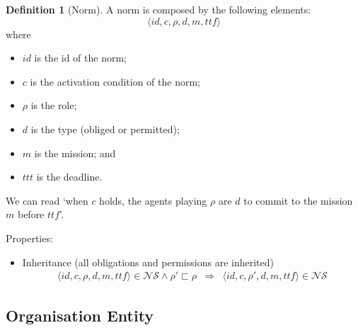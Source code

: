 \documentclass{article}
\newcommand{\set}[1]{\mathcal{#1}}
\newcommand{\subrole}{\sqsubset}
\theoremstyle{definition} \newtheorem{definition}{Definition}
\begin{document}
\begin{definition}[Norm]
  A norm is composed by the following elements:
 \begin{displaymath}
    \langle id, c, \rho, d, m, ttf \rangle
  \end{displaymath}
  where 
  \begin{itemize}
  \item $id$ is the id of the norm;
  \item $c$ is the activation condition of the norm;
  \item $\rho$ is the role;
  \item $d$ is the type (obliged or permitted);
  \item $m$ is the mission; and
  \item $ttt$ is the deadline.

  \end{itemize}
  We can read `when $c$ holds, the agents playing $\rho$ are $d$ to
  commit to the mission $m$ before $ttf$'.


Properties:
\begin{itemize}
\item Inheritance (all obligations and permissions are inherited)
  \begin{eqnarray}
     \langle id, c, \rho, d, m, ttf \rangle \in \set{NS} \land \rho' \subrole \rho &\Rightarrow&  \langle id, c, \rho', d, m, ttf \rangle \in \set{NS}
  \end{eqnarray}

\end{itemize}

\end{definition}


\subsection{Organisation Entity}
\end{document}
